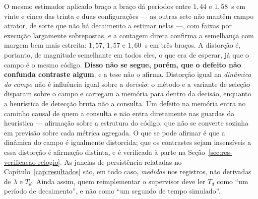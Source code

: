 
O mesmo estimador aplicado braço a braço dá períodos entre $1{,}44$ e $1{,}58$~s em
vinte e cinco das trinta e duas configurações --- as outras sete não mantêm campo
atrator, de sorte que não há decaimento a estimar nelas ---, com faixas por execução
largamente sobrepostas, e a contagem direta
confirma a semelhança com margem bem mais estreita: $1{,}57$, $1{,}57$ e $1{,}60$~s
em três braços. A distorção é, portanto, de magnitude semelhante em todos eles, o que era de esperar, já que o campo
é o mesmo código. \textbf{Disso não se segue, porém, que o defeito não confunda
contraste algum}, e a tese não o afirma. Distorção igual na \emph{dinâmica do campo} não
é influência igual sobre a \emph{decisão}: o método e a variante de seleção disparam
sobre o campo e carregam a memória para dentro da decisão, enquanto a heurística de
detecção bruta não a consulta. Um defeito na memória entra no caminho causal de quem a
consulta e não entra diretamente nas guardas da heurística --- afirmação sobre a
estrutura do código, que não se converte sozinha em previsão sobre cada métrica
agregada. O que se pode afirmar é que a dinâmica do campo é
igualmente distorcida; que os contrastes sejam insensíveis a essa distorção é afirmação
distinta, e é verificada à parte na
Seção~\ref{sec:res-verificacao-relogio}. As janelas de persistência relatadas no
Capítulo~\ref{cap:resultados} são, em todo caso, \emph{medidas} nos registros, não
derivadas de $\lambda$ e $T_d$. Ainda assim, quem reimplementar o supervisor deve ler $T_d$ como
``um período de decaimento'', e não como ``um segundo de tempo simulado''.

